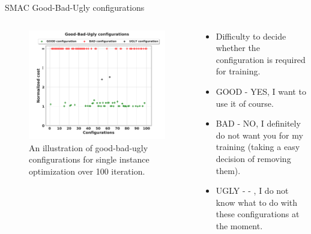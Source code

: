 \documentclass[10pt]{beamer}
\begin{document}
\begin{frame}[t]{SMAC Good-Bad-Ugly configurations}

\begin{columns}[T] %
\begin{column}{.6\textwidth}
\begin{figure}[!ht]
\centering
\includegraphics[width=\linewidth]{images/Good_bad_ugly_cost.pdf}
\captionsetup{justification=justified}
\caption{An illustration of good-bad-ugly configurations for single instance optimization over 100 iteration.}
\label{fig:good-bad-ugly-last}
\end{figure}
\end{column}%
\hfill%
\begin{column}{.4\textwidth}
\begin{itemize}
    \item Difficulty to decide whether the configuration is required for training.
    \newline
    \item GOOD - YES, I want to use it of course.
    \newline
    \item BAD - NO, I definitely do not want you for my training (taking a easy decision of removing them).
    \newline
    \item UGLY - - , I do not know what to do with these configurations at the moment.
\end{itemize}
\end{column}%
\end{columns}
\end{frame}
\end{document}
